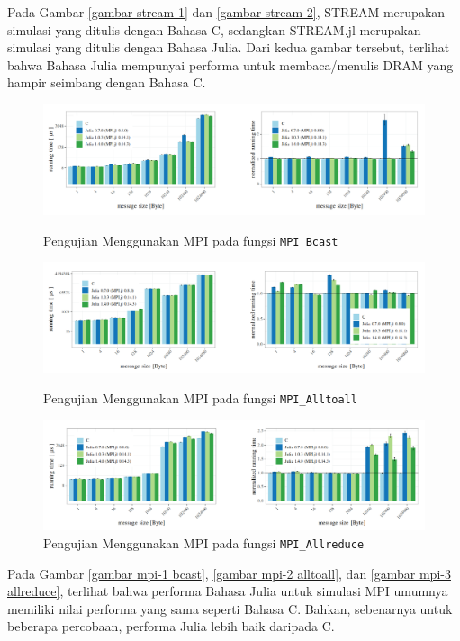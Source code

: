 Pada Gambar \ref{gambar stream-1} dan \ref{gambar stream-2}, STREAM merupakan simulasi
yang ditulis dengan Bahasa C, sedangkan STREAM.jl merupakan simulasi yang
ditulis dengan Bahasa Julia. Dari kedua gambar tersebut, terlihat bahwa Bahasa
Julia mempunyai performa untuk membaca/menulis DRAM yang hampir seimbang dengan
Bahasa C.

\begin{figure}[H]
  \centering
  \includegraphics[width=14cm]{images/mpi-1.png}
  \caption{Pengujian Menggunakan MPI pada fungsi \texttt{MPI\_Bcast}}
  \label{gambar mpi-1 bcast}

  \includegraphics[width=14cm]{images/mpi-2.png}
  \caption{Pengujian Menggunakan MPI pada fungsi \texttt{MPI\_Alltoall}}
  \label{gambar mpi-2 alltoall}

  \includegraphics[width=14cm]{images/mpi-3.png}
  \caption{Pengujian Menggunakan MPI pada fungsi \texttt{MPI\_Allreduce}}
  \label{gambar mpi-3 allreduce}
\end{figure}

Pada Gambar \ref{gambar mpi-1 bcast}, \ref{gambar mpi-2 alltoall}, dan \ref{gambar
mpi-3 allreduce}, terlihat bahwa performa Bahasa Julia untuk simulasi MPI
umumnya memiliki nilai performa yang sama seperti Bahasa C. Bahkan, sebenarnya
untuk beberapa percobaan, performa Julia lebih baik daripada C.

